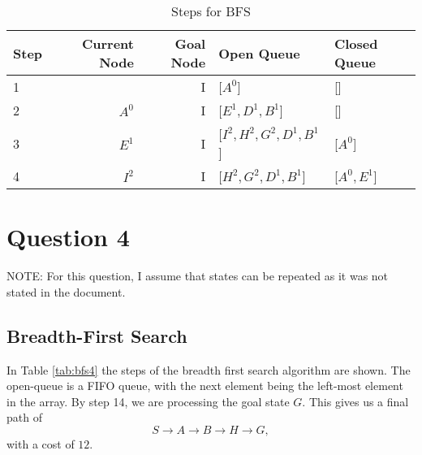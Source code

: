\documentclass{article}
\begin{document}
    \begin{table}[!htp]\centering
        \caption{Steps for BFS}\label{tab:dfs3}
        \scriptsize
        \begin{tabular}{lrrll}\toprule
        Step &Current Node &Goal Node & Open Queue &Closed Queue  \\\midrule
        1&  &I &[$A^0$] &[] \\
        2& $A^0$ &I &[$E^1, D^1, B^1$] &[] \\
        3& $E^1$ &I &[$I^2, H^2, G^2, D^1, B^1$] &[$A^0$] \\
        4& $I^2$ &I &[$H^2, G^2, D^1, B^1$] &[$A^0, E^1$] \\
        \end{tabular}
    \end{table}


\section{Question 4}
    NOTE: For this question, I assume that states can be repeated as it was not stated in the document.
\subsection{Breadth-First Search}
    In Table \ref{tab:bfs4} the steps of the breadth first search algorithm are shown. The open-queue is a FIFO queue, with the next element being the left-most element in the array.
    By step 14, we are processing the goal state $G$. This gives us a final path of
    \begin{equation}
        S \rightarrow A  \rightarrow B \rightarrow H \rightarrow G,
    \end{equation}
    with a cost of $12$.
\end{document}
